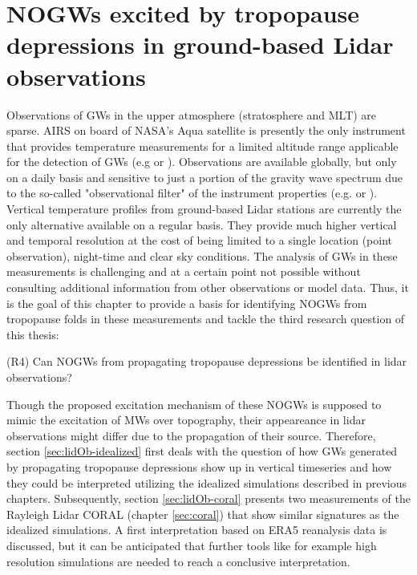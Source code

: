 \chapter{NOGWs excited by tropopause depressions in ground-based Lidar observations}
\label{cha:lidar}

Observations of GWs in the upper atmosphere (stratosphere and MLT) are sparse. AIRS on board of NASA’s Aqua satellite is presently the only instrument that provides temperature measurements for a limited altitude range applicable for the detection of GWs (e.g \cite[]{hindley_gravity_2019} or \cite[]{hindley_18year_2020}). Observations are available globally, but only on a daily basis and sensitive to just a portion of the gravity wave spectrum due to the so-called "observational filter" of the instrument properties (e.g. \cite[]{preusse_space-based_2002} or \cite[]{alexander_recent_2010}). Vertical temperature profiles from ground-based Lidar stations are currently the only alternative available on a regular basis. They provide much higher vertical and temporal resolution at the cost of being limited to a single location (point observation), night-time and clear sky conditions. The analysis of GWs in these measurements is challenging and at a certain point not possible without consulting additional information from other observations or model data. Thus, it is the goal of this chapter to provide a basis for identifying NOGWs from tropopause folds in these measurements and tackle the third research question of this thesis:

\begin{tcolorbox}[]
    (R4) Can NOGWs from propagating tropopause depressions be identified in lidar observations?
\end{tcolorbox}
Though the proposed excitation mechanism of these NOGWs is supposed to mimic the excitation of MWs over topography, their appeareance in lidar observations might differ due to the propagation of their source. Therefore, section \ref{sec:lidOb-idealized} first deals with the question of how GWs generated by propagating tropopause depressions show up in vertical timeseries and how they could be interpreted utilizing the idealized simulations described in previous chapters.
Subsequently, section \ref{sec:lidOb-coral} presents two measurements of the Rayleigh Lidar CORAL (chapter \ref{sec:coral}) that show similar signatures as the idealized simulations. A first interpretation based on ERA5 reanalysis data is discussed, but it can be anticipated that further tools like for example high resolution simulations are needed to reach a conclusive interpretation. 


